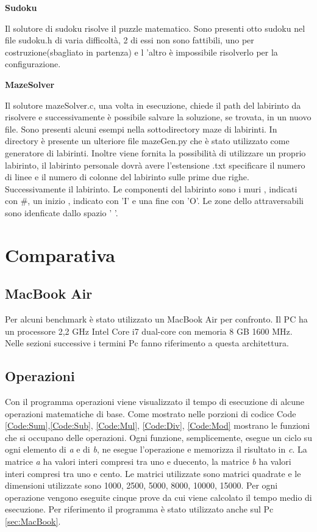 \documentclass[12pt,a4paper]{report}
\begin{document}
\vspace{0.5cm}
\begin{large}
\textbf{Sudoku}
\end{large}

Il solutore di sudoku risolve il puzzle matematico.  Sono presenti otto sudoku nel file sudoku.h di varia difficoltà, 2 di essi non sono fattibili, uno per costruzione(sbagliato in partenza) e l 'altro è impossibile risolverlo per la configurazione.

\vspace{0.5cm}
\begin{large}
\textbf{MazeSolver}
\end{large}

Il solutore mazeSolver.c, una volta in esecuzione, chiede il path del labirinto da risolvere e successivamente è possibile salvare la soluzione, se trovata, in un nuovo file.  Sono presenti alcuni esempi nella sottodirectory maze di labirinti.
In directory è presente un ulteriore file mazeGen.py che è stato utilizzato come generatore di labirinti. 
Inoltre viene fornita la possibilità di utilizzare un proprio labirinto, il labirinto personale dovrà avere l'estensione .txt specificare il numero di linee e il numero di colonne del labirinto sulle prime due righe. Successivamente  il labirinto. Le componenti del labirinto sono i muri , indicati con \#, un inizio , indicato con 'I' e una fine con 'O'. Le zone dello attraversabili sono idenficate dallo spazio ' '.



\chapter{Comparativa}

\section*{MacBook Air}
\label{sec:MacBook}
Per alcuni benchmark è stato utilizzato un MacBook Air per confronto.  Il PC ha un processore 2,2 GHz Intel Core i7 dual-core con memoria 8 GB 1600 MHz. Nelle sezioni successive i termini Pc fanno riferimento a questa architettura.

\section{Operazioni}
	Con il programma operazioni viene visualizzato il tempo di esecuzione di alcune operazioni matematiche di base. Come mostrato nelle porzioni di codice Code \ref{Code:Sum},\ref{Code:Sub}, \ref{Code:Mul}, \ref{Code:Div}, \ref{Code:Mod} mostrano le funzioni che si occupano delle operazioni. Ogni funzione, semplicemente, esegue un ciclo su ogni elemento di \textit{a} e di \textit{b}, ne esegue l'operazione e memorizza il risultato in \textit{c}.  La matrice \textit{a} ha valori interi compresi tra uno e duecento,  la matrice \textit{b} ha valori interi compresi tra uno e cento. Le matrici utilizzate sono matrici quadrate e le dimensioni utilizzate sono 1000, 2500, 5000, 8000, 10000, 15000. Per ogni operazione vengono eseguite cinque prove da cui viene calcolato il tempo medio di esecuzione. 
	Per riferimento il programma è stato utilizzato anche sul Pc \ref{sec:MacBook}. 
	
\end{document}
